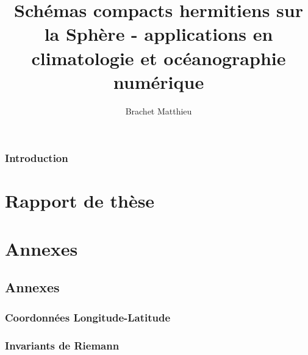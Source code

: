 \documentclass[10pt,a4paper]{book}
\author{Brachet Matthieu}
\title{Schémas compacts hermitiens sur la Sphère - applications en climatologie et océanographie numérique}
\begin{document}
\maketitle
\newpage
\tableofcontents
\listoffigures
\listoftables

\newpage

\section*{Introduction}
%

\part{Rapport de thèse}










\part{Annexes}

\chapter{Annexes}
\section{Coordonnées Longitude-Latitude}

\section{Invariants de Riemann}



%



\end{document}
